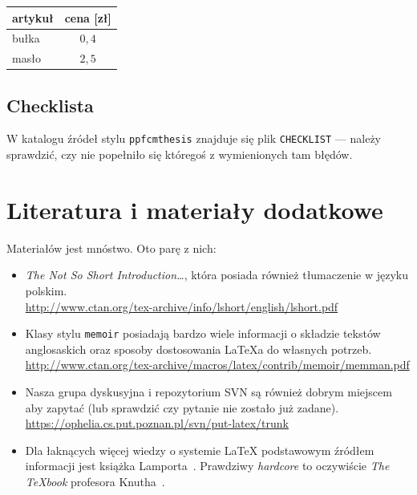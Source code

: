 \begin{table}[h]
\label{tab:tabela2}
\centering\footnotesize%
\begin{tabular}{l c}
\toprule
artykuł & cena [zł] \\
\midrule
bułka   & $0,4$ \\
masło   & $2,5$ \\
\bottomrule
\end{tabular}
\end{table}


\subsection{Checklista}

W katalogu źródeł stylu \texttt{ppfcmthesis} znajduje się plik \texttt{CHECKLIST} --- należy
sprawdzić, czy nie popełniło się któregoś z wymienionych tam błędów.


\section{Literatura i materiały dodatkowe}

Materiałów jest mnóstwo. Oto parę z nich:
\begin{itemize}
    \item \emph{The Not So Short Introduction\ldots}, która posiada również tłumaczenie 
    w języku polskim.\\
    \url{http://www.ctan.org/tex-archive/info/lshort/english/lshort.pdf}

    \item Klasy stylu \texttt{memoir} posiadają bardzo wiele informacji o składzie tekstów
    anglosaskich oraz sposoby dostosowania \LaTeX{}a do własnych potrzeb.\\
    \url{http://www.ctan.org/tex-archive/macros/latex/contrib/memoir/memman.pdf}
    
    \item Nasza grupa dyskusyjna i repozytorium SVN są również dobrym miejscem aby zapytać
    (lub sprawdzić czy pytanie nie zostało już zadane).\\
    \url{https://ophelia.cs.put.poznan.pl/svn/put-latex/trunk}

    \item Dla łaknących więcej wiedzy o systemie \LaTeX{} podstawowym źródłem informacji
    jest książka Lamporta~\cite{Lamport:LDP85}. Prawdziwy \emph{hardcore} to oczywiście
    \emph{The \TeX{}book} profesora Knutha~\cite{Knuth:ct-a}.
\end{itemize}

